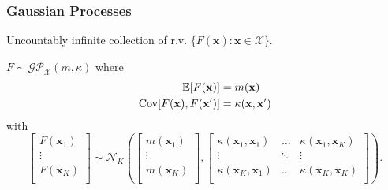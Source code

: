 \documentclass{beamer}
\begin{document}
\begin{frame}
    \frametitle{Gaussian Processes}

    Uncountably infinite collection of r.v.
    $\{ F(\mathbf{x}) : \mathbf{x} \in \mathcal{X} \}$.

    \pause
    \begin{definition}
        $F \sim \mathcal{GP}_{ \mathcal{X}}(m, \kappa)$ where
        \begin{align*}
            \mathbb{E}[F(\mathbf{x})] & = m(\mathbf{x}) \\
            \operatorname{Cov}[F(\mathbf{x}), F(\mathbf{x}')] & = \kappa(\mathbf{x}, \mathbf{x}')
        \end{align*}
        with
        \pause
        \begin{equation*}
            \begin{bmatrix}
                F(\mathbf{x}_1) \\
                \vdots \\
                F(\mathbf{x}_K) \\
            \end{bmatrix}
            \sim
            \mathcal{N}_{K}
            \left(
            \begin{bmatrix}
                    m(\mathbf{x}_1) \\
                    \vdots \\
                    m(\mathbf{x}_K) \\
                \end{bmatrix}
            ,
            \begin{bmatrix}
                    \kappa(\mathbf{x}_1, \mathbf{x}_1) & \dots & \kappa(\mathbf{x}_1, \mathbf{x}_K) \\
                    \vdots & \ddots & \vdots \\
                    \kappa(\mathbf{x}_K, \mathbf{x}_1) & \dots & \kappa(\mathbf{x}_K, \mathbf{x}_K) \\
                \end{bmatrix}
            \right).
        \end{equation*}
    \end{definition}
\end{frame}
\end{document}
